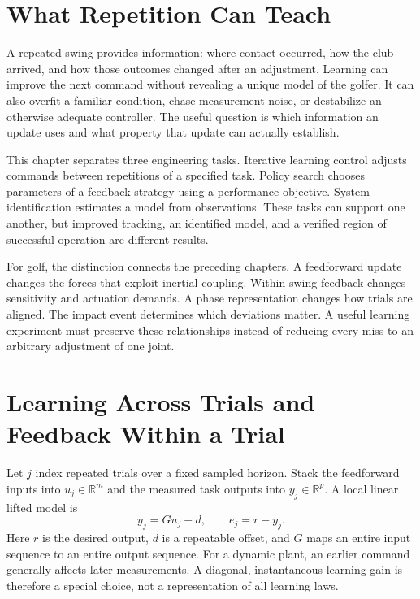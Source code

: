 \documentclass[12pt, openany]{book}
\theoremstyle{plain}
\begin{document}
\section{What Repetition Can Teach}

A repeated swing provides information: where contact occurred, how the club arrived, and how those outcomes changed after an adjustment. Learning can improve the next command without revealing a unique model of the golfer. It can also overfit a familiar condition, chase measurement noise, or destabilize an otherwise adequate controller. The useful question is which information an update uses and what property that update can actually establish.

This chapter separates three engineering tasks. Iterative learning control adjusts commands between repetitions of a specified task. Policy search chooses parameters of a feedback strategy using a performance objective. System identification estimates a model from observations. These tasks can support one another, but improved tracking, an identified model, and a verified region of successful operation are different results.

For golf, the distinction connects the preceding chapters. A feedforward update changes the forces that exploit inertial coupling. Within-swing feedback changes sensitivity and actuation demands. A phase representation changes how trials are aligned. The impact event determines which deviations matter. A useful learning experiment must preserve these relationships instead of reducing every miss to an arbitrary adjustment of one joint.

\section{Learning Across Trials and Feedback Within a Trial}

Let $j$ index repeated trials over a fixed sampled horizon. Stack the feedforward inputs into $u_j\in\mathbb R^m$ and the measured task outputs into $y_j\in\mathbb R^p$. A local linear lifted model is
\begin{equation}
y_j=G u_j+d,\qquad e_j=r-y_j .
\end{equation}
Here $r$ is the desired output, $d$ is a repeatable offset, and $G$ maps an entire input sequence to an entire output sequence. For a dynamic plant, an earlier command generally affects later measurements. A diagonal, instantaneous learning gain is therefore a special choice, not a representation of all learning laws.
\end{document}
